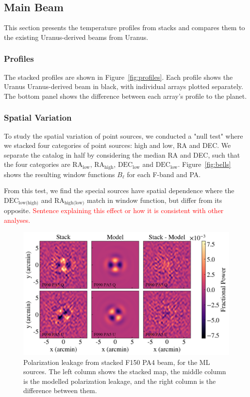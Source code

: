 \subsection{Main Beam}
\label{subsec:mainbeam}
This section presents the temperature profiles from stacks and compares them to the existing Uranus-derived beams from Uranus. 
\subsubsection{Profiles}
\label{subsubsec:profiles}
The stacked profiles are shown in Figure~\ref{fig:profiles}.  Each profile shows the Uranus Uranus-derived beam in black, with individual arrays plotted separately.  The bottom panel shows the difference between each array's profile to the planet.
\subsubsection{Spatial Variation}
\label{subsubsec:null_mainbeam}

To study the spatial variation of point sources, we conducted a "null test" where we stacked four categories of point sources: high and low, RA and DEC.  We separate the catalog in half by considering the median RA and DEC, such that the four categories are $\text{RA}_{\text{low}}$, $\text{RA}_{\text{high}}$, $\text{DEC}_{\text{low}}$ and $\text{DEC}_{\text{low}}$. 
 Figure~\ref{fig:bells} shows the resulting window functions $B_{\ell}$ for each F-band and PA.

From this test, we find the special sources have spatial dependence where the $\text{DEC}_{\text{low(high)}}$ and $\text{RA}_{\text{high(low)}}$ match in window function, but differ from its opposite.  \textcolor{red}{Sentence explaining this effect or how it is consistent with other analyses.}
\begin{figure}[t]
    \centering
    \includegraphics[width = \textwidth]{Figures/polbeams.png}
    \caption{Polarization leakage from stacked F150 PA4 beam, for the ML sources.  The left column shows the stacked map, the middle column is the modelled polarization leakage, and the right column is the difference between them.}
    \label{fig:polmodel}
\end{figure}


